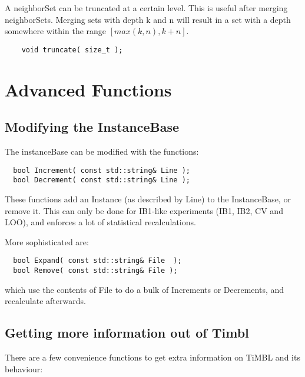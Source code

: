 \documentclass{report}
\begin{document}
A neighborSet can be truncated at a certain level. This is useful
after merging neighborSets. Merging sets with depth k and n will
result in a set with a depth somewhere within the range $[max(k,n), k+n]$.

\begin{footnotesize}
\begin{verbatim}
    void truncate( size_t );
\end{verbatim}
\end{footnotesize}

\chapter{Advanced Functions}

\section{Modifying the InstanceBase}

The instanceBase can be modified with the functions:

\begin{footnotesize}
\begin{verbatim}
  bool Increment( const std::string& Line ); 
  bool Decrement( const std::string& Line ); 
\end{verbatim}
\end{footnotesize}

These functions add an Instance (as described by Line) to the
InstanceBase, or remove it.  This can only be done for IB1-like
experiments (IB1, IB2, CV and LOO), and enforces a lot of
statistical recalculations.

More sophisticated are:

\begin{footnotesize}
\begin{verbatim}
  bool Expand( const std::string& File  );
  bool Remove( const std::string& File );
\end{verbatim}
\end{footnotesize}

which use the contents of File to do a bulk of Increments or Decrements, and
recalculate afterwards.

\section{Getting more information out of Timbl}

There are a few convenience functions to get extra information on
TiMBL and its behaviour:
\end{document}
